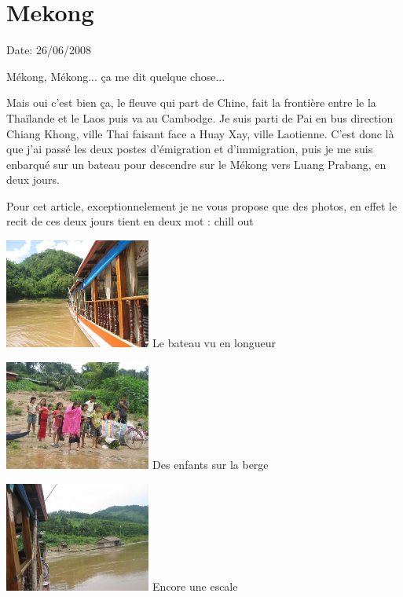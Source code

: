 \section{Mekong}

Date: 26/06/2008

\begin{multicols}{2}

Mékong, Mékong... ça me dit quelque chose...

Mais oui c'est bien ça, le fleuve qui part de Chine, fait la frontière entre le la Thaïlande et le Laos puis va au Cambodge. Je suis parti de Pai en bus direction Chiang Khong, ville Thai faisant face a Huay Xay, ville Laotienne. C'est donc là que j'ai passé les deux postes d'émigration et d'immigration, puis je me suis enbarqué sur un bateau pour descendre sur le Mékong vers Luang Prabang, en deux jours.

Pour cet article, exceptionnelement je ne vous propose que des photos, en effet le recit de ces deux jours tient en deux mot : chill out

\hspace*{-0.65cm}
\includegraphics[width=4.8cm]{articles/Mekong/1214473370zy1a.jpg}
Le bateau vu en longueur

\hspace*{-0.65cm}
\includegraphics[width=4.8cm]{articles/Mekong/12144733896AMi.jpg}
Des enfants sur la berge

\hspace*{-0.65cm}
\includegraphics[width=4.8cm]{articles/Mekong/1214473395mtro.jpg}
Encore une escale


\end{multicols}

